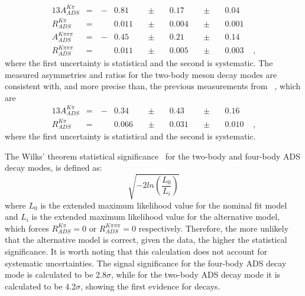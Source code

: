 \begin{alignat*}{13}
A_{ADS}^{K\pi} &= &\ -&0.81&\ &\pm&\ &0.17&\ &\pm&\ &0.04& \\
R_{ADS}^{K\pi} &= &\ &0.011&\ &\pm&\ &0.004&\ &\pm&\ &0.001& \\
A_{ADS}^{K\pi\pi\pi} &= &\ -&0.45&\ &\pm&\ &0.21&\ &\pm&\ &0.14& \\
R_{ADS}^{K\pi\pi\pi} &= &\ &0.011&\ &\pm&\ &0.005&\ &\pm&\ &0.003& \text{ ,}
\end{alignat*}
where the first uncertainty is statistical and the second is systematic. The measured asymmetries and ratios for the two-body \Dz meson decay modes are consistent with, and more precise than, the previous measurements from \babar~\cite{BaBarDKstar}, which are
\begin{alignat*}{13}
A_{ADS}^{K\pi} &= &\ -&0.34&\ &\pm&\ &0.43&\ &\pm&\ &0.16& \\
R_{ADS}^{K\pi} &= &\ &0.066&\ &\pm&\ &0.031&\ &\pm&\ &0.010& \text{ ,}
\end{alignat*}
where the first uncertainty is statistical and the second is systematic.

The Wilks' theorem statistical significance~\cite{Wilks:1938dza} for the two-body and four-body ADS decay modes, is defined as:
\begin{equation}
\sqrt{-2ln\left(\frac{L_0}{L_i}\right)}
\end{equation}
where $L_0$ is the extended maximum likelihood value for the nominal \CP fit model and $L_i$ is the extended maximum likelihood value for the alternative model, which forces $R_{ADS}^{K\pi} = 0$ or $R_{ADS}^{K\pi\pi\pi} = 0$ respectively. Therefore, the more unlikely that the alternative model is correct, given the data, the higher the statistical significance. It is worth noting that this calculation does not account for systematic uncertainties. The signal significance for the four-body ADS decay mode is calculated to be 2.8$\sigma$, while for the two-body ADS decay mode it is calculated to be 4.2$\sigma$, showing the first evidence for \pik decays.


